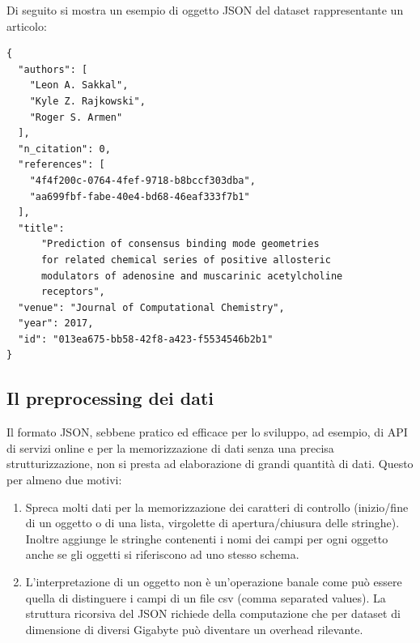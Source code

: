 \documentclass[a4paper, 12pt]{article}
\begin{document}
Di seguito si mostra un esempio di oggetto JSON del dataset rappresentante un articolo:
\begin{lstlisting}[keepspaces=true]
{
  "authors": [
    "Leon A. Sakkal",
    "Kyle Z. Rajkowski",
    "Roger S. Armen"
  ],
  "n_citation": 0,
  "references": [
    "4f4f200c-0764-4fef-9718-b8bccf303dba",
    "aa699fbf-fabe-40e4-bd68-46eaf333f7b1"
  ],
  "title":
      "Prediction of consensus binding mode geometries
      for related chemical series of positive allosteric
      modulators of adenosine and muscarinic acetylcholine
      receptors",
  "venue": "Journal of Computational Chemistry",
  "year": 2017,
  "id": "013ea675-bb58-42f8-a423-f5534546b2b1"
}
\end{lstlisting}
\subsection{Il preprocessing dei dati}
Il formato JSON, sebbene pratico ed efficace per lo sviluppo, ad esempio, di API di servizi online e per la memorizzazione di dati senza una precisa strutturizzazione, non si presta ad elaborazione di grandi quantità di dati. Questo per almeno due motivi:
\begin{enumerate}  
  \item Spreca molti dati per la memorizzazione dei caratteri di controllo (inizio/fine di un oggetto o di una lista, virgolette di apertura/chiusura delle stringhe). Inoltre aggiunge le stringhe contenenti i nomi dei campi per ogni oggetto anche se gli oggetti si riferiscono ad uno stesso schema.
  \item L'interpretazione di un oggetto non è un'operazione banale come può essere quella di distinguere i campi di un file csv (comma separated values). La struttura ricorsiva del JSON richiede della computazione che per dataset di dimensione di diversi Gigabyte può diventare un overhead rilevante.
\end{enumerate}
\end{document}
